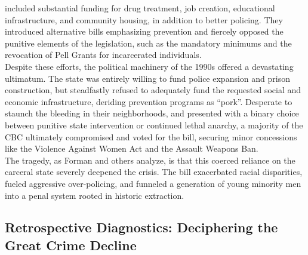 \documentclass[
]{article}
\begin{document}
included substantial funding for drug treatment, job creation,
educational infrastructure, and community housing, in addition to better
policing. They introduced alternative bills emphasizing prevention and
fiercely opposed the punitive elements of the legislation, such as the
mandatory minimums and the revocation of Pell Grants for incarcerated
individuals.\\
Despite these efforts, the political machinery of the 1990s offered a
devastating ultimatum. The state was entirely willing to fund police
expansion and prison construction, but steadfastly refused to adequately
fund the requested social and economic infrastructure, deriding
prevention programs as ``pork''. Desperate to staunch the bleeding in
their neighborhoods, and presented with a binary choice between punitive
state intervention or continued lethal anarchy, a majority of the CBC
ultimately compromised and voted for the bill, securing minor
concessions like the Violence Against Women Act and the Assault Weapons
Ban.\\
The tragedy, as Forman and others analyze, is that this coerced reliance
on the carceral state severely deepened the crisis. The bill exacerbated
racial disparities, fueled aggressive over-policing, and funneled a
generation of young minority men into a penal system rooted in historic
extraction.

\subsection{\texorpdfstring{\textbf{Retrospective Diagnostics:
Deciphering the Great Crime
Decline}}{Retrospective Diagnostics: Deciphering the Great Crime Decline}}\label{retrospective-diagnostics-deciphering-the-great-crime-decline}
\end{document}
